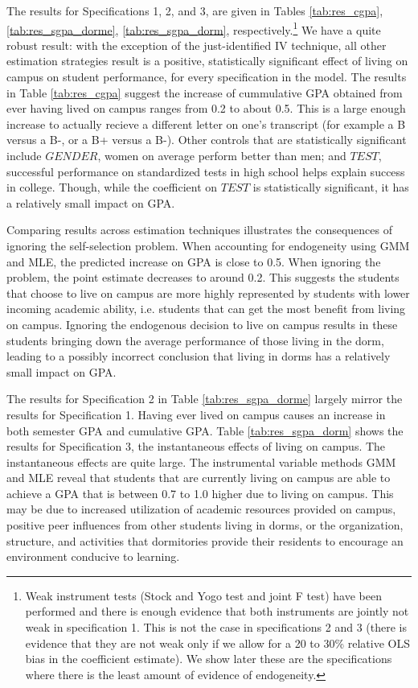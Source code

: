\documentclass[12pt]{article}
\begin{document}
The results for Specifications 1, 2, and 3, are given in Tables \ref{tab:res_cgpa}, \ref{tab:res_sgpa_dorme}, \ref{tab:res_sgpa_dorm}, respectively.\footnote{Weak instrument tests (Stock and Yogo test and joint F test) have been performed and there is enough evidence that both instruments are jointly not weak in specification 1. This is not the case in specifications 2 and 3 (there is evidence that they are not weak only if we allow for a 20 to 30\% relative OLS bias in the coefficient estimate).  We show later these are the specifications where there is the least amount of evidence of endogeneity.}  We have a quite robust result: with the exception of the just-identified IV technique, all other estimation strategies result is a positive, statistically significant effect of living on campus on student performance, for every specification in the model.  The results in Table \ref{tab:res_cgpa} suggest the increase of cummulative GPA obtained from ever having lived on campus ranges from 0.2 to about 0.5.  This is a large enough increase to actually recieve a different letter on one's transcript (for example a B versus a B-, or a B+ versus a B-).  Other controls that are statistically significant include $GENDER$, women on average perform better than men; and $TEST$, successful performance on standardized tests in high school helps explain success in college.  Though, while the coefficient on $TEST$ is statistically significant, it has a relatively small impact on GPA.

Comparing results across estimation techniques illustrates the consequences of ignoring the self-selection problem.  When accounting for endogeneity using GMM and MLE, the predicted increase on GPA is close to 0.5.  When ignoring the problem, the point estimate decreases to around 0.2.  This suggests the students that choose to live on campus are more highly represented by students with lower incoming academic ability, i.e. students that can get the most benefit from living on campus.  Ignoring the endogenous decision to live on campus results in these students bringing down the average performance of those living in the dorm, leading to a possibly incorrect conclusion that living in dorms has a relatively small impact on GPA.  

The results for Specification 2 in Table \ref{tab:res_sgpa_dorme} largely mirror the results for Specification 1.  Having ever lived on campus causes an increase in both semester GPA and cumulative GPA.  Table \ref{tab:res_sgpa_dorm} shows the results for Specification 3, the instantaneous effects of living on campus.  The instantaneous effects are quite large.  The instrumental variable methods GMM and MLE reveal that students that are currently living on campus are able to achieve a GPA that is between 0.7 to 1.0 higher due to living on campus.  This may be due to increased utilization of academic resources provided on campus, positive peer influences from other students living in dorms, or the organization, structure, and activities that dormitories provide their residents to encourage an environment conducive to learning.
\end{document}
